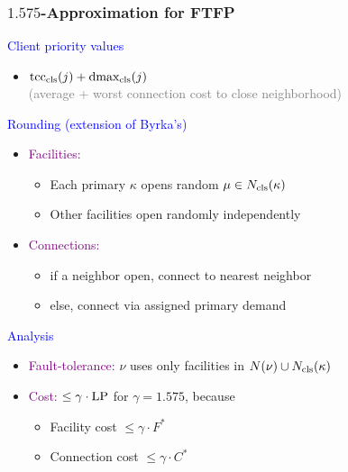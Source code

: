 \documentclass[hyperref,dvipsnames,svgnames]{beamer}
\begin{document}
\begin{frame}
\frametitle{$1.575$-Approximation for FTFP}

{\large

\textcolor{blue}{Client priority values}	
	
	\begin{itemize}
		\item $\mbox{\rm{tcc}}_{{\mbox{\scriptsize\rm cls}}}(j) + \mbox{\rm{dmax}}_{{\mbox{\scriptsize\rm cls}}}(j)$
			\\
			{\normalsize \textcolor{gray}{(average + worst connection cost to close neighborhood)}}
	\end{itemize}

\textcolor{blue}{Rounding (extension of Byrka's)}

  	\begin{itemize}
  	  	\item  \textcolor{purple}{Facilities:} 
			\begin{itemize}
				\item Each primary $\kappa$ opens random $\mu\in N_{{\mbox{\scriptsize\rm cls}}}(\kappa)$
				\item Other facilities open randomly independently
			\end{itemize}
	  	\item \textcolor{purple}{Connections:} 
	 		\begin{itemize}
					\item if a neighbor open, connect to nearest neighbor
					\item else, connect via assigned primary demand
			\end{itemize}
  	\end{itemize}

\textcolor{blue}{Analysis}

  \begin{itemize}
  	\item \textcolor{purple}{Fault-tolerance:} $\nu$ uses only facilities in
	    $N(\nu) \cup N_{{\mbox{\scriptsize\rm cls}}}(\kappa)$
	
  	\item \textcolor{purple}{Cost:} $\le \gamma\cdot\mbox{\rm LP}$ for $\gamma = 1.575$, because
    \begin{itemize}
    \item Facility cost $ \leq \gamma\cdot F^\ast$
    \item Connection cost $ \leq \gamma\cdot C^\ast$
    \end{itemize}
\end{itemize}
}

\end{frame}
\end{document}
